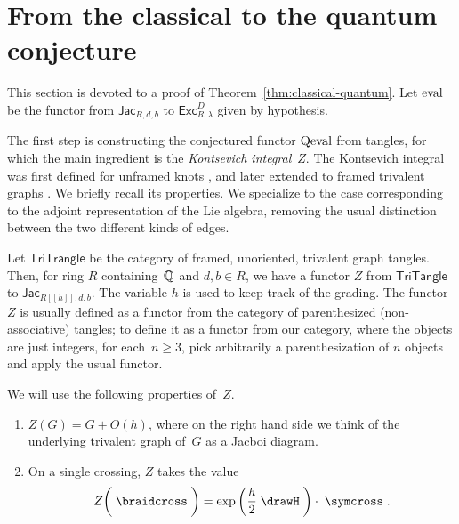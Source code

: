 \documentclass[12pt]{amsart}
\begin{document}
\section{From the classical to the quantum conjecture}
\label{sec:classical-quantum}
This section is devoted to a proof of
Theorem~\ref{thm:classical-quantum}. Let $\operatorname{eval}$ be the functor from
$\mathsf{Jac}_{R,d,b}$ to $\mathsf{Exc}^D_{R,\lambda}$ given by hypothesis.

The first step is constructing the conjectured functor $\operatorname{Qeval}$ from tangles,
for which the main ingredient is the \emph{Kontsevich integral}~$Z$. The
Kontsevich integral was first defined for unframed knots \cite{MR1318886}, and
later extended to framed trivalent graphs
\cite{MR1473309,MR2304469,MR2661529}. We briefly recall its properties. We
specialize to the case corresponding to the adjoint representation of the Lie
algebra, removing the usual distinction between the two different kinds of
edges.

Let $\mathsf{TriTrangle}$ be the category of framed, unoriented, trivalent
graph tangles.  Then, for ring
$R$ containing~$\mathbb Q$ and $d,b \in R$, we have a functor $Z$ from
$\mathsf{TriTangle}$ to $\mathsf{Jac}_{R[[h]],d,b}$. The variable $h$
is used to keep track of
the grading. The functor $Z$ is usually defined as a functor from the category of
parenthesized (non-associative) tangles; to define it as a functor from our
category, where the objects are just integers, for each~$n \ge 3$, pick
arbitrarily a parenthesization of $n$ objects and apply the usual functor.

We will use the following properties of~$Z$.
\begin{enumerate}
\item\label{item:Kontsevich-perturb} $Z(G) = G + O(h)$, where on the
  right hand side we think of the
  underlying trivalent graph of~$G$ as a Jacboi diagram.
\item\label{item:Kontsevich-crossing} On a single crossing, $Z$ takes
  the value
  \begin{equation}
    \label{eq:Kontsevich-crossing}
    Z\biggl(\;\braidcross\;\biggr) =
    \exp\left(\frac{h}{2}\;\drawH\;\right)
    \cdot\; \symcross\;.
  \end{equation}
\end{enumerate}
\end{document}

